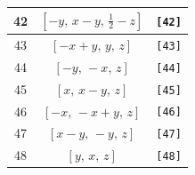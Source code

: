\documentclass[fleqn,8pt]{jsarticle}
\begin{document}
\begin{longtable}{ccc}
42 & $\left[ - y,\, x - y,\, \frac{1}{2} - z \right]$ & {\tt [42]} \\ \hline
43 & $\left[ - x + y,\, y,\, z \right]$ & {\tt [43]} \\ \hline
44 & $\left[ - y,\, - x,\, z \right]$ & {\tt [44]} \\ \hline
45 & $\left[ x,\, x - y,\, z \right]$ & {\tt [45]} \\ \hline
46 & $\left[ - x,\, - x + y,\, z \right]$ & {\tt [46]} \\ \hline
47 & $\left[ x - y,\, - y,\, z \right]$ & {\tt [47]} \\ \hline
48 & $\left[ y,\, x,\, z \right]$ & {\tt [48]} \\
\end{longtable}
\end{document}
